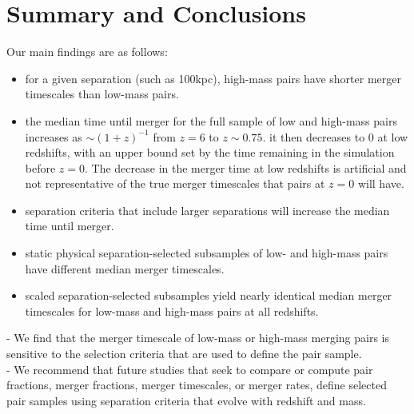 \documentclass[twocolumn,linenumbers]{aastex631}
\begin{document}
\section{Summary and Conclusions}


Our main findings are as follows: 
\begin{itemize}
    \item for a given separation (such as 100kpc), high-mass pairs have shorter merger timescales than low-mass pairs. 
    \item the median time until merger for the full sample of low and high-mass pairs increases as $\sim(1+z)^{-1}$ from $z=6$ to $z\sim0.75$. it then decreases to 0 at low redshifts, with an upper bound set by the time remaining in the simulation before $z=0$. The decrease in the merger time at low redshifts is artificial and not representative of the true merger timescales that pairs at $z=0$ will have.
    \item separation criteria that include larger separations will increase the median time until merger.
    \item static physical separation-selected subsamples of low- and high-mass pairs have different median merger timescales.
    \item scaled separation-selected subsamples yield nearly identical median merger timescales for low-mass and high-mass pairs at all redshifts. 
\end{itemize}

- We find that the merger timescale of low-mass or high-mass merging pairs is sensitive to the selection criteria that are used to define the pair sample.\\

- We recommend that future studies that seek to compare or compute pair fractions, merger fractions, merger timescales, or merger rates, define selected pair samples using separation criteria that evolve with redshift and mass. 














{}

\end{document}
